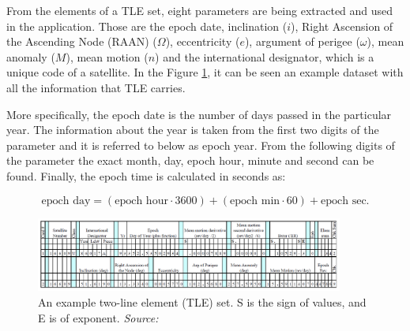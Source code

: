 From the elements of a TLE set, eight parameters are being extracted and used in the application. Those are the epoch date, inclination ($i$), Right Ascension of the Ascending Node (RAAN) ($\Omega$), eccentricity ($e$), argument of perigee ($\omega$), mean anomaly ($M$), mean motion ($n$) and the international designator, which is a unique code of a satellite. In the Figure \ref{tle}, it can be seen an example dataset with all the information that TLE carries.


More specifically, the epoch date is the number of days passed in the particular year. The information about the year is taken from the first two digits of the parameter and it is referred to below as epoch year. From the following digits of the parameter the exact month, day, epoch hour, minute and second can be found. Finally, the epoch time is calculated in seconds as:

\begin{equation}
\label{epoch}
\text{epoch day} = (\text{epoch hour} \cdot 3600) + (\text{epoch min} \cdot 60) + \text{epoch sec}.
\end{equation}


\begin{figure}
\centering
\includegraphics[width=0.9\textwidth]{Images/tle.png}\caption{An example two-line element (TLE) set. S is the sign of values, and E is of exponent. \textit{Source: \cite{Vallado}}}
\label{tle} 
\end{figure}

